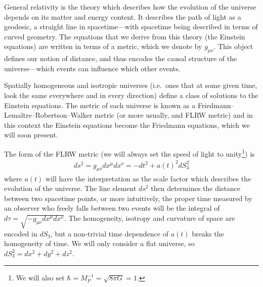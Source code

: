     General relativity is the theory which describes how the evolution of the universe depends
    on its matter and energy content. It describes the path of light as a geodesic, a straight line
    in spacetime---with spacetime being described in terms of curved geometry.
    The equations that we derive from this theory (the Einstein equations) are written in terms of a metric,
    which we denote by $g_{\mu\nu}$. This object defines our notion of distance, and thus encodes
    the causal structure of the universe---which events can influence which other events.
    

    Spatially homogeneous and isotropic universes (i.e.\ ones that at some given
    time, look the same everywhere and in every direction)
    define a class of solutions to the Einstein equations.
    The metric of each universe is known as a Friedmann–Lemaître–Robertson–Walker metric
    (or more usually, and FLRW metric) and in this context
    the Einstein equations become the Friedmann equations, which we will soon present.


    The form of the FLRW metric (we will always set the speed of light to unity\footnote{
        We will also set $\hbar=M_P^{-1}=\sqrt{8\pi G}=1$.
    }) is
    \begin{align}\label{flrw_metric}
        ds^2 = g_{\mu\nu}dx^{\mu}dx^{\nu} = - dt^2 + a(t)^2 dS_3^2
    \end{align}
    where $a(t)$ will have the interpretation as the scale factor
    which describes the evolution of the universe.
    The line element $ds^2$ then determines the distance between two spacetime points,
    or more intuitively, the proper time measured by an observer who freely falls
    between two events will be the integral of $d\tau=\sqrt{-g_{\mu\nu}dx^\mu dx^\nu}$.
    The homogeneity, isotropy and curvature of space are encoded in $dS_3$,
    but a non-trivial time dependence of $a(t)$ breaks the homogeneity of time.
    We will only consider a flat universe, so $dS_3^2=dx^2+dy^2+dz^2$.


